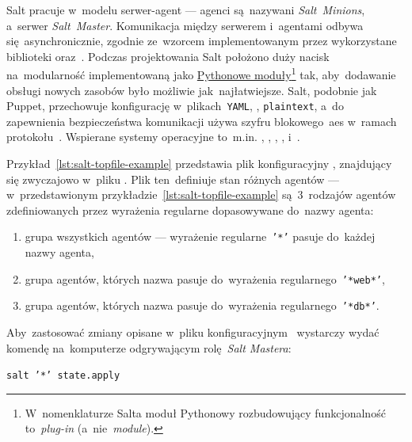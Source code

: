 \documentclass[thesis]{subfiles}
\begin{document}
Salt pracuje w~modelu serwer-agent --- agenci są~nazywani \emph{Salt~Minions}, a~serwer \emph{Salt~Master}. Komunikacja między serwerem i~agentami odbywa się~asynchronicznie, zgodnie ze~wzorcem  implementowanym przez wykorzystane biblioteki  oraz~. Podczas projektowania Salt położono duży nacisk na~modularność implementowaną jako \href{https://docs.python.org/3.7/tutorial/modules.html}{Pythonowe moduły}\footnote{W~nomenklaturze Salta moduł Pythonowy rozbudowujący funkcjonalność to~\emph{plug-in} (a~nie~\emph{module}).} tak, aby~dodawanie obsługi nowych zasobów było możliwie jak~najłatwiejsze. Salt, podobnie jak Puppet, przechowuje konfigurację w~plikach~\texttt{YAML}, \json{}, \texttt{plaintext}, a~do zapewnienia bezpieczeństwa komunikacji używa szyfru blokowego~\gls{aes} w~ramach protokołu~. Wspierane systemy operacyjne to~m.in. \emph{}, , , ,  i~.

Przykład~\ref{lst:salt-topfile-example} przedstawia plik konfiguracyjny , znajdujący się zwyczajowo w~pliku . Plik ten~definiuje stan różnych agentów --- w~przedstawionym przykładzie~\ref{lst:salt-topfile-example} są~3~rodzajów agentów zdefiniowanych przez wyrażenia regularne dopasowywane do~nazwy agenta:\mynobreakpar
\begin{enumerate}
	\item grupa wszystkich agentów --- wyrażenie regularne~\texttt{'*'} pasuje do~każdej nazwy agenta,
	\item grupa agentów, których nazwa pasuje do~wyrażenia regularnego~\texttt{'*web*'},
	\item grupa agentów, których nazwa pasuje do~wyrażenia regularnego~\texttt{'*db*'}.
\end{enumerate}
Aby~zastosować zmiany opisane w~pliku konfiguracyjnym~ wystarczy wydać komendę na~komputerze odgrywającym rolę~\emph{Salt Mastera}:\mynobreakpar
\begin{center}
	\texttt{salt '*' state.apply}
\end{center}
\end{document}

